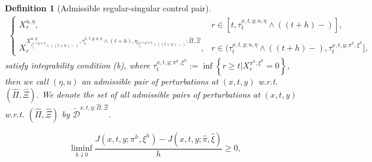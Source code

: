 \documentclass[10pt,a4paper]{amsart}
\newtheorem{definition}{Definition}
\begin{document}
\begin{definition}[Admissible regular-singular control pair]
\begin{equation}
\begin{aligned}
\begin{cases}
X^{u,\eta}_{r}, & r\in[t,\tau^{x,t,y;u,\eta}_{t}\wedge((t+h)-)],\\
X^{X^{u,\eta}_{\tau^{x,t,y;u,\eta}_{t}\wedge((t+h)-)},\tau^{x,t,y;u,\eta}_{t}\wedge(t+h),\eta_{\tau^{x,t,y;u,\eta}_{t}\wedge((t+h)-)};\hat{\Pi},\hat{\Xi}}_{r}, &  r\in(\tau^{x,t,y;u,\eta}_{t}\wedge((t+h)-),\tau^{x,t,y;\pi^h,\xi^h}_{t}],
\end{cases}
\end{aligned}\label{xpihxih}
\end{equation}
satisfy integrability condition (b), where $\tau^{x,t,y;\pi^h,\xi^h}_{t}:=\inf\left\{r\ge t|X^{\pi^h,\xi^h}_{r}= 0\right\}$, then we call $\left(\eta,u\right)$ an admissible pair of perturbations at $(x,t,y)$  w.r.t. $\left(\hat\Pi, \hat\Xi\right)$. We denote the set of all admissible pairs of perturbations at $(x,t,y)$  w.r.t. $\left(\hat\Pi, \hat\Xi\right)$ by $\mathcal{\tilde D}^{x,t,y;\hat\Pi,\hat\Xi}$.
\end{definition}

\begin{equation}
\label{equicond}
\liminf\limits_{h\downarrow 0}\frac{J\left(x,t,y;\pi^{h},\xi^{h}\right)-J\left(x,t,y;\hat{\pi},\hat{\xi}\right)}{h}\ge 0,
\end{equation}
\end{document}
